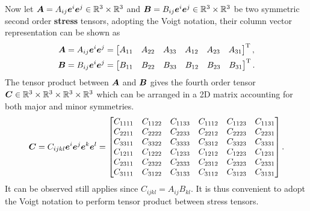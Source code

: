 Now let $\bm{A}=A_{ij}\bm{e}^i\bm{e}^j\in\mathbb{R}^3\times\mathbb{R}^3$ and $\bm{B}=B_{ij}\bm{e}^i\bm{e}^j\in\mathbb{R}^3\times\mathbb{R}^3$ be two symmetric second order \textbf{stress} tensors, adopting the Voigt notation, their column vector representation can be shown as
\begin{gather}
\bm{A}=A_{ij}\bm{e}^i\bm{e}^j=\begin{bmatrix}
A_{11}&A_{22}&A_{33}&A_{12}&A_{23}&A_{31}
\end{bmatrix}^{\mathrm{T}},\\
\bm{B}=B_{ij}\bm{e}^i\bm{e}^j=\begin{bmatrix}
B_{11}&B_{22}&B_{33}&B_{12}&B_{23}&B_{31}
\end{bmatrix}^{\mathrm{T}}.
\end{gather}
The tensor product  between $\bm{A}$ and $\bm{B}$ gives the fourth order tensor $\bm{C}\in\mathbb{R}^3\times\mathbb{R}^3\times\mathbb{R}^3\times\mathbb{R}^3$ which can be arranged in a 2D matrix accounting for both major and minor symmetries.
\begin{gather}
\bm{C}=C_{ijkl}\bm{e}^i\bm{e}^j\bm{e}^k\bm{e}^l=\begin{bmatrix}
C_{1111}&C_{1122}&C_{1133}&C_{1112}&C_{1123}&C_{1131}\\
C_{2211}&C_{2222}&C_{2233}&C_{2212}&C_{2223}&C_{2231}\\
C_{3311}&C_{3322}&C_{3333}&C_{3312}&C_{3323}&C_{3331}\\
C_{1211}&C_{1222}&C_{1233}&C_{1212}&C_{1223}&C_{1231}\\
C_{2311}&C_{2322}&C_{2333}&C_{2312}&C_{2323}&C_{2331}\\
C_{3111}&C_{3122}&C_{3133}&C_{3112}&C_{3123}&C_{3131}
\end{bmatrix}.
\end{gather}
It can be observed  still applies since $C_{ijkl}=A_{ij}B_{kl}$. It is thus convenient to adopt the Voigt notation to perform tensor product between stress tensors.

